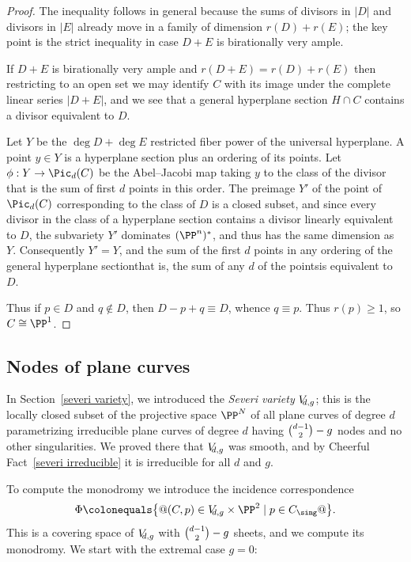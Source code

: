 \begin{proof}
 The inequality follows in general because the sums of divisors in $|D|$
 and divisors in $|E|$ already move in
 a family of dimension $r(D)+r(E)$; the key point is the strict inequality
 in case $D+E$ is birationally very ample.

If $D+E$ is birationally very ample and $r(D+E) = r(D)+r(E)$ then
restricting to an open set
we may identify $C$ with its image under the complete linear series
$|D+E|$, and we see that a general hyperplane section $H\cap C$ contains
a divisor equivalent to $D$.

Let $Y$ be the $\deg D +\deg E$ restricted fiber power of the universal
hyperplane.
A point $y\in Y$ is a hyperplane section plus an ordering of its points.
Let $\phi: Y \to \Pic_d(C)$ be the
Abel--Jacobi map
%
 taking $y$
 to the class of the divisor that is the sum of first $d$ points in this
 order. The preimage  $Y'$ of the point of $\Pic_d(C)$ corresponding to
 the class of $D$ is a closed subset, and
since every divisor in the class of a hyperplane section contains
a divisor
linearly equivalent to  $D$, the subvariety $Y'$ dominates $(\PP^{n})^*$,
and thus
has the same dimension as~$Y$. Consequently $Y'=Y$, and the sum of the
first $d$ points
in any ordering of the general hyperplane section\emdash that is, the
sum of any $d$
of the points\emdash is equivalent to $D$.

Thus if $p\in D$ and $q\notin D$, then $D-p+q \equiv D$, whence $q\equiv
p$. Thus
$r(p)\geq 1$, so $C\cong \PP^1$.
\end{proof}

\subsection*{Nodes of plane curves}

\def\VD#1{V_{\mskip-5mu d,#1}} %

In Section~\ref{severi variety}, we introduced the \emph{Severi variety}
%
$\VD{g}$; this is the locally closed subset of the projective space
$\PP^N$ of all plane curves of degree $d$ parametrizing irreducible
plane curves of degree $d$ having
$\tbinom{d-1}{2} - \nobreak g$
nodes and no other singularities. We proved there that $\VD{g}$ was
smooth, and by Cheerful Fact~\ref{severi irreducible} it is irreducible
for all $d$ and $g$.

To compute the monodromy we introduce the incidence correspondence
$$
\Phi \colonequals \big\{@(C, p) \in \VD{g} \times \PP^2 \mid p \in C_{\sing}
@\big\}.
$$
This is a
covering space of $\VD{g}$
with $\tbinom{d-1}{2} - \nobreak g$ sheets,
and we compute its
monodromy. We start with the extremal case $g = 0$:


